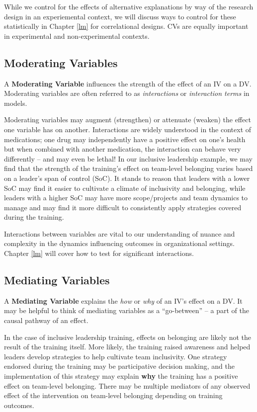 \documentclass[]{book}
\begin{document}
While we control for the effects of alternative explanations by way of the research design in an experiemental context, we will discuss ways to control for these statistically in Chapter \ref{lm} for correlational designs. CVs are equally important in experimental and non-experimental contexts.

\hypertarget{moderating-variables}{%
\subsection{Moderating Variables}\label{moderating-variables}}

A \textbf{Moderating Variable} influences the strength of the effect of an IV on a DV. Moderating variables are often referred to as \emph{interactions} or \emph{interaction terms} in models.

Moderating variables may augment (strengthen) or attenuate (weaken) the effect one variable has on another. Interactions are widely understood in the context of medications; one drug may independently have a positive effect on one's health but when combined with another medication, the interaction can behave very differently -- and may even be lethal! In our inclusive leadership example, we may find that the strength of the training's effect on team-level belonging varies based on a leader's span of control (SoC). It stands to reason that leaders with a lower SoC may find it easier to cultivate a climate of inclusivity and belonging, while leaders with a higher SoC may have more scope/projects and team dynamics to manage and may find it more difficult to consistently apply strategies covered during the training.

Interactions between variables are vital to our understanding of nuance and complexity in the dynamics influencing outcomes in organizational settings. Chapter \ref{lm} will cover how to test for significant interactions.

\hypertarget{mediating-variables}{%
\subsection{Mediating Variables}\label{mediating-variables}}

A \textbf{Mediating Variable} explains the \emph{how} or \emph{why} of an IV's effect on a DV. It may be helpful to think of mediating variables as a ``go-between'' -- a part of the causal pathway of an effect.

In the case of inclusive leadership training, effects on belonging are likely not the result of the training itself. More likely, the training raised awareness and helped leaders develop strategies to help cultivate team inclusivity. One strategy endorsed during the training may be participative decision making, and the implementation of this strategy may explain \textbf{why} the training has a positive effect on team-level belonging. There may be multiple mediators of any observed effect of the intervention on team-level belonging depending on training outcomes.
\end{document}
